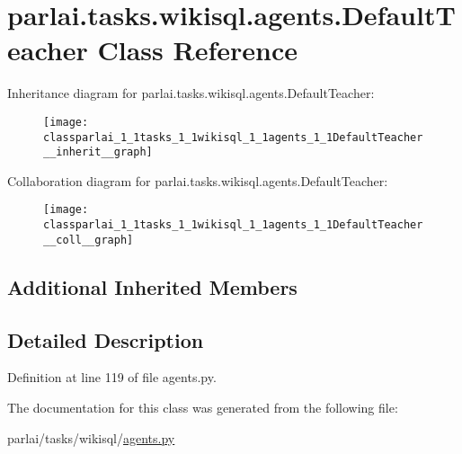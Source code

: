 \hypertarget{classparlai_1_1tasks_1_1wikisql_1_1agents_1_1DefaultTeacher}{}\section{parlai.\+tasks.\+wikisql.\+agents.\+Default\+Teacher Class Reference}
\label{classparlai_1_1tasks_1_1wikisql_1_1agents_1_1DefaultTeacher}


Inheritance diagram for parlai.\+tasks.\+wikisql.\+agents.\+Default\+Teacher\+:
\nopagebreak
\begin{figure}[H]
\begin{center}
\leavevmode
\texttt{[image: classparlai\_1\_1tasks\_1\_1wikisql\_1\_1agents\_1\_1DefaultTeacher\_\_inherit\_\_graph]}
\end{center}
\end{figure}


Collaboration diagram for parlai.\+tasks.\+wikisql.\+agents.\+Default\+Teacher\+:
\nopagebreak
\begin{figure}[H]
\begin{center}
\leavevmode
\texttt{[image: classparlai\_1\_1tasks\_1\_1wikisql\_1\_1agents\_1\_1DefaultTeacher\_\_coll\_\_graph]}
\end{center}
\end{figure}
\subsection*{Additional Inherited Members}


\subsection{Detailed Description}


Definition at line 119 of file agents.\+py.



The documentation for this class was generated from the following file\+:\begin{DoxyCompactItemize}
\item 
parlai/tasks/wikisql/\hyperlink{parlai_2tasks_2wikisql_2agents_8py}{agents.\+py}\end{DoxyCompactItemize}
